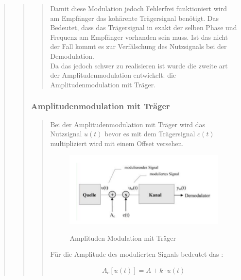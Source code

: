 \begin{quote}
\begin{quote}
\begin{quote}
             Damit diese Modulation jedoch Fehlerfrei funktioniert wird am Empfänger das kohärente Trägersignal
             benötigt. Das Bedeutet, dass das Trägersignal in exakt der selben Phase und Frequenz am Empfänger vorhanden
             sein muss. Ist das nicht der Fall kommt es zur Verfälschung des Nutzsignals bei der Demodulation.\\
             Da das jedoch schwer zu realisieren ist wurde die zweite art der Amplitudenmodulation entwickelt:
             die Amplitudenmodulation mit Träger.
             
            
		\end{quote}
		
		\subsubsection{Amplitudenmodulation mit Träger}
		\begin{quote}
			Bei der Amplitudenmodulation mit Träger wird das Nutzsignal $u(t)$ bevor es mit dem Trägersignal $c(t)$
			multipliziert wird mit einem Offset versehen.
			
			\begin{figure}[H]
            \centering
                \includegraphics[scale=0.7, trim = 0cm 0cm 0cm 0cm, clip]{./Bilder/AMmitTraeger}
                    \caption{Amplituden Modulation mit Träger}
                    \cite{AMmitUeber}
            \end{figure}
            
            Für die Amplitude des modulierten Signals bedeutet das :
            
            \begin{equation*}
                \begin{split}
                    A_c [u(t)] = A + k \cdot u(t)
                \end{split}
            \end{equation*}
            

\end{quote}
\end{quote}
\end{quote}
